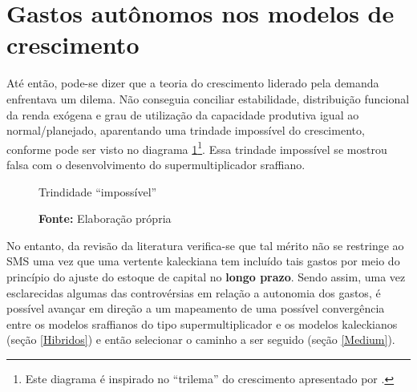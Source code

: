 \section{Gastos autônomos nos modelos de crescimento}\label{SecAutonomos}

Até então, pode-se dizer que a teoria do crescimento liderado pela demanda enfrentava um dilema. Não conseguia conciliar estabilidade, distribuição funcional da renda exógena e grau de utilização da capacidade produtiva igual ao normal/planejado, aparentando uma trindade impossível do crescimento, conforme pode ser visto no diagrama \ref{diagrama}\footnote{Este diagrama é inspirado no ``trilema'' do crescimento apresentado por \textcite{cesaratto_neo-kaleckian_2015}.}.
Essa trindade impossível se mostrou falsa com o desenvolvimento do supermultiplicador sraffiano.


\begin{figure}[htb]
	\caption{Trindidade ``impossível''}
	\label{diagrama}
	\begin{center}
	\end{center}
	\caption*{\textbf{Fonte:} Elaboração própria}
\end{figure}

No entanto, da revisão da literatura verifica-se que tal mérito não se restringe ao SMS uma vez que uma vertente kaleckiana tem incluído tais gastos por meio do princípio do ajuste do estoque de capital no \textbf{longo prazo}.
Sendo assim, uma vez esclarecidas algumas das controvérsias em relação a autonomia dos gastos, é possível avançar em direção a um mapeamento de uma possível convergência entre os modelos sraffianos do tipo supermultiplicador e os modelos kaleckianos (seção \ref{Hibridos}) e então selecionar o caminho a ser seguido (seção \ref{Medium}).


